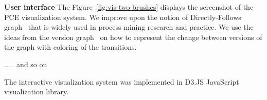 \noindent\textbf{%
	User interface
} The Figure~\ref{fig:vis-two-brushes} displays the screenshot of the PCE visualization system. 
We improve upon the notion of Directly-Follows graph~\cite{leemans2019directly} that is widely used in process mining research and practice. We use the ideas from the version graph~\cite{DBLP:conf/grapp/KriglsteinR12} on how to represent the change between versions of the graph with coloring of the transitions. 

..... and so on

The interactive visualization system was implemented in D3.JS JavaScript visualization library.








